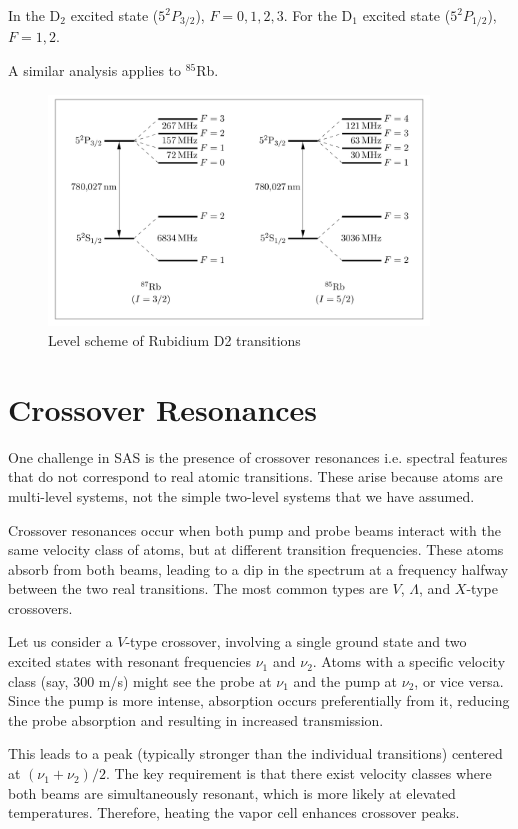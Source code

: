 \documentclass[a4paper, 12pt]{article}
\begin{document}
In the D$_2$ excited state ($5^2P_{3/2}$), $F = 0, 1, 2, 3$. For the D$_1$ excited state ($5^2P_{1/2}$), $F = 1, 2$.

A similar analysis applies to $^{85}$Rb.

\begin{figure}[h!]
    \centering
    \includegraphics[width=0.9\textwidth]{level-scheme.png}
    \caption{Level scheme of Rubidium D2 transitions}
    \label{fig:level-scheme}
\end{figure}

\section{Crossover Resonances}
One challenge in SAS is the presence of crossover resonances  i.e. spectral features that do not correspond to real atomic transitions. These arise because atoms are multi-level systems, not the simple two-level systems that we have assumed.

Crossover resonances occur when both pump and probe beams interact with the same velocity class of atoms, but at different transition frequencies. These atoms absorb from both beams, leading to a dip in the spectrum at a frequency halfway between the two real transitions. The most common types are $V$, $\Lambda$, and $X$-type crossovers.

Let us consider a $V$-type crossover, involving a single ground state and two excited states with resonant frequencies $\nu_1$ and $\nu_2$. Atoms with a specific velocity class (say, 300 m/s) might see the probe at $\nu_1$ and the pump at $\nu_2$, or vice versa. Since the pump is more intense, absorption occurs preferentially from it, reducing the probe absorption and resulting in increased transmission.

This leads to a peak (typically stronger than the individual transitions) centered at $(\nu_1 + \nu_2)/2$. The key requirement is that there exist velocity classes where both beams are simultaneously resonant, which is more likely at elevated temperatures. Therefore, heating the vapor cell enhances crossover peaks.
\end{document}
